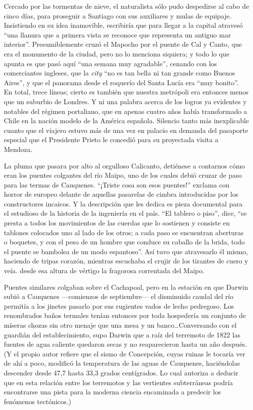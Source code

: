 \documentclass[10pt,twoside,openright]{memoir}
\begin{document}
Cercado
por las tormentas de nieve, el naturalista sólo pudo despedirse al cabo
de cinco días, para proseguir a Santiago con sus auxiliares y mulas de
equipaje. Insistiendo en su idea inamovible, escribiría que para llegar
a la capital atravesó ``una llanura que a primera vista se reconoce que
representa un antiguo mar interior''. Presumiblemente cruzó el Mapocho
por el puente de Cal y Canto, que era el monumento de la ciudad, pero no
lo menciona siquiera; y todo lo que apunta es que pasó aquí ``una semana
muy agradable'', cenando con los comerciantes ingleses, que la
\emph{city} ``no es tan bella ni tan grande como Buenos Aires'', y que el
panorama desde el roquerío del Santa Lucía era ``muy bonito''. En total,
trece líneas; cierto es también que nuestra metrópoli era entonces menos
que un suburbio de Londres. Y ni una palabra acerca de los logros ya
evidentes y notables del régimen portaliano, que en apenas cuatro
años había transformado a Chile en
la nación modelo de la América española. Silencio tanto más inexplicable
cuanto que el viajero estuvo más de una vez en palacio en demanda del
pasaporte especial que el Presidente Prieto le concedió para su
proyectada visita a Mendoza.

La pluma que pasara por alto al orgulloso Calicanto, detiénese a
contarnos cómo eran los puentes colgantes del río Maipo, uno de los
cuales debió cruzar de paso para las termas de Cauquenes. ``¡Triste
cosa son esos puentes!'' exclama con
horror de europeo delante de
aquellas pasarelas de cimbra introducidas por los constructores
incaicos. Y la descripción que les dedica es pieza documental para
el estudioso de la historia de la
ingeniería en el país. ``El tablero o piso'', dice, ``se presta a todos los
movimientos de las cuerdas que lo sostienen y consiste en tablones
colocados uno al lado de los otros; a cada paso se encuentran aberturas
o boquetes, y con el peso de un hombre que conduce su caballo de la
brida, todo el puente se bambolea de un modo espantoso''. Así tuvo que
atravesarlo él mismo, haciendo de tripas corazón, mientras escuchaba el
crujir de los tirantes de cuero y veía. desde esa altura de vértigo la
fragorosa correntada del Maipo.

Puentes similares colgaban sobre el Cachapoal,
pero en la estación en que Darwin
subió a Cauquenes ---comienzos de septiembre--- el disminuido caudal del
río permitía a los jinetes pasarlo por sus rugientes vados de lecho
pedregoso. Los renombrados baños termales tenían entonces por toda
hospedería un conjunto de míseras chozas sin otro menaje que una mesa y
un banco\ldots Conversando con el guardián del establecimiento, supo Darwin
que a raíz del terremoto de 1822 las fuentes de agua caliente quedaron
secas y no reaparecieron hasta un año después. (Y el propio autor
refiere que el sismo de Concepción, cuyas ruinas le tocaría ver de ahí a
poco, modificó la temperatura de las aguas de Cauquenes, haciéndolas
descender desde 47,7 hasta 33,3 grados centígrados. Lo cual autoriza a
deducir que en esta relación entre los terremotos y las vertientes
subterráneas podría encontrarse una pista para la moderna ciencia
encaminada a predecir los fenómenos tectónicos.)
\end{document}
